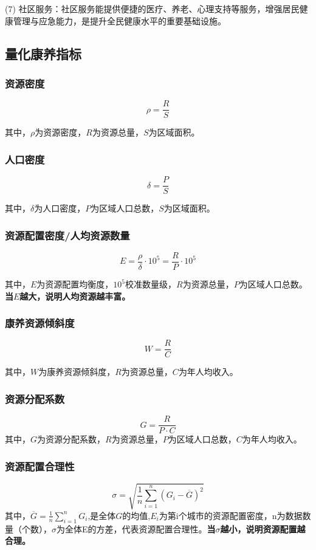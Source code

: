 \documentclass[12pt,a4paper]{article}
\begin{document}
\begin{multicols}{2}
(7) 社区服务：社区服务能提供便捷的医疗、养老、心理支持等服务，增强居民健康管理与应急能力，是提升全民健康水平的重要基础设施。

\subsection{量化康养指标}

\subsubsection{资源密度}
\[
\rho = \frac{R}{S}
\]

其中，$\rho$为资源密度，$R$为资源总量，$S$为区域面积。

\subsubsection{人口密度}
\[
\delta = \frac{P}{S}
\]

其中，$\delta$为人口密度，$P$为区域人口总数，$S$为区域面积。

\subsubsection{资源配置密度/人均资源数量}
\[
E = \frac{\rho}{\delta}\cdot 10^5=\frac{R}{P}\cdot 10^5
\]

其中，$E$为资源配置均衡度，$10^5$校准数量级，$R$为资源总量，$P$为区域人口总数。\textbf{当$E$越大，说明人均资源越丰富。}

\subsubsection{康养资源倾斜度}

\[
W=\frac{R}{C}
\]

其中，$W$为康养资源倾斜度，$R$为资源总量，$C$为年人均收入。

\subsubsection{资源分配系数}

\[
G=\frac{R}{P\cdot C}
\]
其中，$G$为资源分配系数，$R$为资源总量，$P$为区域人口总数，$C$为年人均收入。

\subsubsection{资源配置合理性}
\[
\sigma = \sqrt{\frac{1}{n} \sum_{i=1}^{n}(G_i - \overline{G})^2}
\]
其中，$\overline{G} = \frac{1}{n} \sum_{i=1}^{n}G_i$,是全体$G$的均值,$E_i$为第i个城市的资源配置密度，n为数据数量（个数），$\sigma$为全体E的方差，代表资源配置合理性。\textbf{当$\sigma$越小，说明资源配置越合理。}


\end{multicols}
\end{document}
